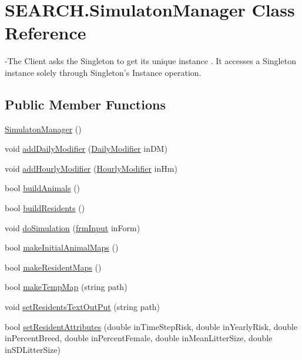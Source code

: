 \hypertarget{class_s_e_a_r_c_h_1_1_simulaton_manager}{\section{S\-E\-A\-R\-C\-H.\-Simulaton\-Manager Class Reference}
\label{class_s_e_a_r_c_h_1_1_simulaton_manager}
}


-\/\-The Client asks the Singleton to get its unique instance . It accesses a Singleton instance solely through Singleton's Instance operation.  


\subsection*{Public Member Functions}
\begin{DoxyCompactItemize}
\item 
\hyperlink{class_s_e_a_r_c_h_1_1_simulaton_manager_a95ad0a5a8dbe4988d71d7a677a70769e}{Simulaton\-Manager} ()
\item 
void \hyperlink{class_s_e_a_r_c_h_1_1_simulaton_manager_a9657bba4a36ac70cecf22c35b8112298}{add\-Daily\-Modifier} (\hyperlink{class_s_e_a_r_c_h_1_1_daily_modifier}{Daily\-Modifier} in\-D\-M)
\item 
void \hyperlink{class_s_e_a_r_c_h_1_1_simulaton_manager_aab0124936a4fe932e3803527f996faca}{add\-Hourly\-Modifier} (\hyperlink{class_s_e_a_r_c_h_1_1_hourly_modifier}{Hourly\-Modifier} in\-Hm)
\item 
bool \hyperlink{class_s_e_a_r_c_h_1_1_simulaton_manager_a6c48b286777a875e82efaf8f9cf4cd72}{build\-Animals} ()
\item 
bool \hyperlink{class_s_e_a_r_c_h_1_1_simulaton_manager_a16ff580d96ea8e1fa4fd3dc08d6a5e61}{build\-Residents} ()
\item 
void \hyperlink{class_s_e_a_r_c_h_1_1_simulaton_manager_ada1ed055be96685ccca12dd6e6d1dc4a}{do\-Simulation} (\hyperlink{class_s_e_a_r_c_h_1_1frm_input}{frm\-Input} in\-Form)
\item 
bool \hyperlink{class_s_e_a_r_c_h_1_1_simulaton_manager_aab843881bab783ac55bcaafd0b4609d1}{make\-Initial\-Animal\-Maps} ()
\item 
bool \hyperlink{class_s_e_a_r_c_h_1_1_simulaton_manager_ab960c75bf04a58e10cbe47b2712cfbcc}{make\-Resident\-Maps} ()
\item 
bool \hyperlink{class_s_e_a_r_c_h_1_1_simulaton_manager_a803d588dfdc97b9d788c08031e170939}{make\-Temp\-Map} (string path)
\item 
void \hyperlink{class_s_e_a_r_c_h_1_1_simulaton_manager_a0ba373c5f331bd9224a0c00bb8e1705c}{set\-Residents\-Text\-Out\-Put} (string path)
\item 
bool \hyperlink{class_s_e_a_r_c_h_1_1_simulaton_manager_ae03bae84f1c0a77c2fdca0107cc20189}{set\-Resident\-Attributes} (double in\-Time\-Step\-Risk, double in\-Yearly\-Risk, double in\-Percent\-Breed, double in\-Percent\-Female, double in\-Mean\-Litter\-Size, double in\-S\-D\-Litter\-Size)
\end{DoxyCompactItemize}
